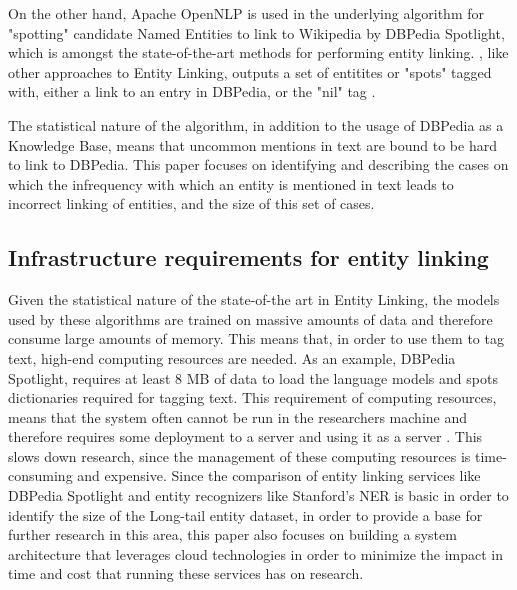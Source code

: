 On the other hand, Apache OpenNLP is used in the underlying algorithm for "spotting" candidate Named Entities to link to Wikipedia by DBPedia Spotlight\cite{rw_elo_isem2013daiber},
which is amongst the state-of-the-art methods for performing entity linking. \cite{rw_elo_isem2013daiber}, like other approaches to Entity Linking, outputs a set of entitites or "spots" tagged with, either a link to an entry in DBPedia\cite{rw_elo_morsey2012dbpedia}, or the "nil" tag \cite{rw_elo_HACHEY2013130}. 


The statistical nature of the algorithm, in addition to the usage of DBPedia as a Knowledge Base, means that uncommon mentions in text are bound to be hard to link to DBPedia. This paper focuses on identifying and describing the cases on which the infrequency with which an entity is mentioned in text leads to incorrect linking of entities, and the size of this set of cases.


\subsection{Infrastructure requirements for entity linking}
Given the statistical nature of the state-of-the art in Entity Linking, the models used by these algorithms are trained on massive amounts of data and therefore consume large amounts of memory. This means that, in order to use them to tag text, high-end computing resources are needed. As an example, DBPedia Spotlight, requires at least 8 MB of data \cite{rw_elo_isem2013daiber} to load the language models and spots dictionaries required for tagging text. This requirement of computing resources, means that the system often cannot be run in the researchers machine and therefore requires some deployment to a server and using it as a server \cite{rw_elo_spotlightwebservice}. This slows down research, since the management of these computing resources is time-consuming and expensive. Since the comparison of entity linking services like DBPedia Spotlight and entity recognizers like Stanford's NER is basic in order to identify the size of the Long-tail entity dataset, in order to provide a base for further research in this area, this paper also focuses on building a system architecture that leverages cloud technologies in order to minimize the impact in time and cost that running these services has on research. 


